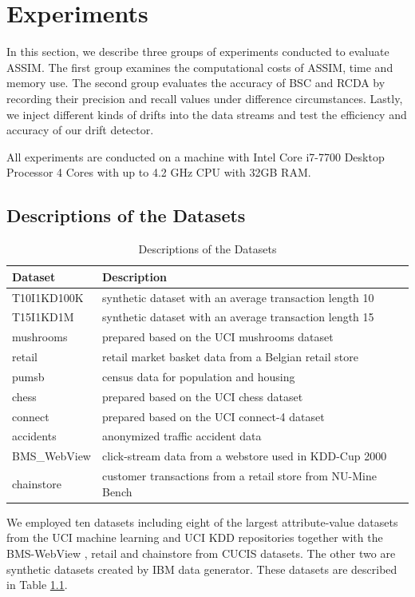\chapter{Experiments} \label{chapt:Experiments}

In this section, we describe three groups of experiments conducted to evaluate ASSIM. The first group examines the computational costs of ASSIM, time and memory use. The second group evaluates the accuracy of BSC and RCDA by recording their precision and recall values under difference circumstances. Lastly, we inject different kinds of drifts into the data streams and test the efficiency and accuracy of our drift detector. 

All experiments are conducted on a machine with Intel Core i7-7700 Desktop Processor 4 Cores with up to 4.2 GHz CPU with 32GB RAM.


\section{Descriptions of the Datasets}

\begin{table}[h!]
\caption{Descriptions of the Datasets}
\label{tb:datasets}
\begin{center}
\addtolength{\tabcolsep}{4.0pt}
\begin{tabular}{ll}
    \toprule
    \multirow{1}{*}{Dataset} &
      \multicolumn{1}{l}{Description} \\
      \midrule
    T10I1KD100K & {synthetic dataset with an average transaction length 10}  \\
    T15I1KD1M & {synthetic dataset with an average transaction length 15}  \\
    mushrooms & {prepared based on the UCI mushrooms dataset}  \\
    retail & {retail market basket data from a Belgian retail store}\\
    pumsb & {census data for population and housing}\\
    chess & {prepared based on the UCI chess dataset}\\
    connect & {prepared based on the UCI connect-4 dataset}\\
    accidents & {anonymized traffic accident data}\\
    BMS\_WebView & {click-stream data from a webstore used in KDD-Cup 2000}\\
    chainstore &  {customer transactions from a retail store from NU-Mine Bench}\\
    \bottomrule
\end{tabular}
\end{center}
\end{table}
We employed ten datasets including eight of the largest attribute-value datasets from the UCI machine learning \cite{uci1,uci2} and UCI KDD \cite{uci3} repositories together with the BMS-WebView \cite{bms}, retail \cite{retail} and chainstore from CUCIS\cite{CUCIS} datasets. The other two are synthetic datasets created by IBM data generator. These datasets are described in Table \ref{tb:datasets}. %

